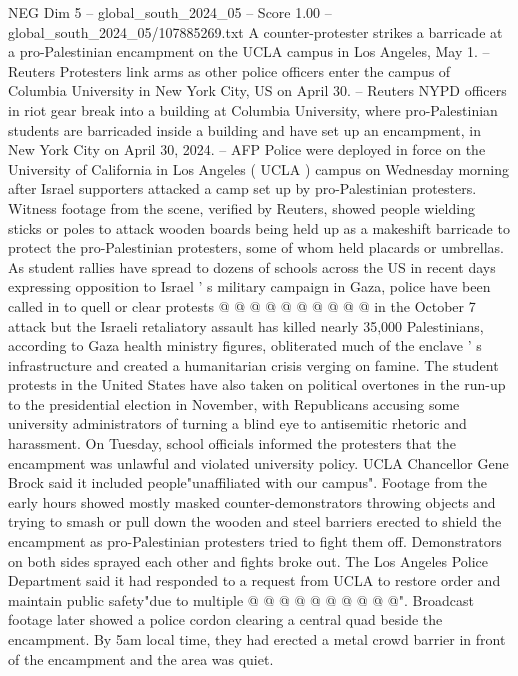 \begin{textsample}{NEG Dim 5 – global\_south\_2024\_05 – Score 1.00 – global\_south\_2024\_05/107885269.txt}  \label{ex:f5_neg_326}
A counter-protester strikes a barricade at a pro-Palestinian encampment on the UCLA campus in Los Angeles, May 1. -- Reuters Protesters link arms as other police officers enter the campus of Columbia University in New York City, US on April 30. -- Reuters NYPD officers in riot gear break into a building at Columbia University, where pro-Palestinian students are barricaded inside a building and have set up an encampment, in New York City on April 30, 2024. -- AFP Police were deployed in force on the University of California in Los Angeles ( UCLA ) campus on Wednesday morning after Israel supporters attacked a camp set up by pro-Palestinian protesters.
Witness footage from the scene, verified by Reuters, showed people wielding sticks or poles to attack wooden boards being held up as a makeshift barricade to protect the pro-Palestinian protesters, some of whom held placards or umbrellas.
As student rallies have spread to dozens of schools across the US in recent days expressing opposition to Israel ' s military campaign in Gaza, police have been called in to quell or clear protests @ @ @ @ @ @ @ @ @ @ in the October 7 attack but the Israeli retaliatory assault has killed nearly 35,000 Palestinians, according to Gaza health ministry figures, obliterated much of the enclave ' s infrastructure and created a humanitarian crisis verging on famine.
The student protests in the United States have also taken on political overtones in the run-up to the presidential election in November, with Republicans accusing some university administrators of turning a blind eye to antisemitic rhetoric and harassment.
On Tuesday, school officials informed the protesters that the encampment was unlawful and violated university policy.
UCLA Chancellor Gene Brock said it included people"unaffiliated with our campus".
Footage from the early hours showed mostly masked counter-demonstrators throwing objects and trying to smash or pull down the wooden and steel barriers erected to shield the encampment as pro-Palestinian protesters tried to fight them off.
Demonstrators on both sides sprayed each other and fights broke out.
The Los Angeles Police Department said it had responded to a request from UCLA to restore order and maintain public safety"due to multiple @ @ @ @ @ @ @ @ @ @".
Broadcast footage later showed a police cordon clearing a central quad beside the encampment.
By 5am local time, they had erected a metal crowd barrier in front of the encampment and the area was quiet.

\end{textsample}

